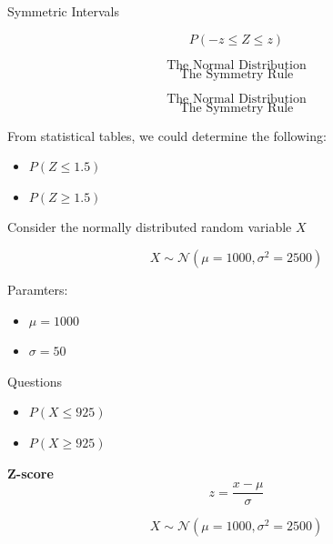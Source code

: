 \documentclass[12pt]{report}
\begin{document}
Symmetric Intervals

\[ P( -z \leq Z \leq z) \]










\huge
\[ \mbox{The Normal Distribution} \]
\Large
\[ \mbox{The Symmetry Rule} \]







\huge
\[ \mbox{The Normal Distribution} \]
\Large
\[ \mbox{The Symmetry Rule} \]



\Large
From statistical tables, we could determine the following:
\begin{itemize}
	\item $P(Z \leq 1.5) $
	\item $P(Z \geq 1.5) $
\end{itemize}



\Large

Consider the normally distributed random variable $X$

\[ X \sim \mathcal{N}(\mu=1000,\sigma^2 = 2500) \]

Paramters:
\begin{itemize}
	\item $\mu =1000$
	\item $\sigma =50$
\end{itemize}
Questions

\begin{itemize}
	\item $P(X \leq 925)$
	\item $P(X \geq 925)$
\end{itemize}




\textbf{Z-score}
\[ z =\frac{x - \mu}{\sigma}\]

\[ X \sim \mathcal{N}(\mu=1000,\sigma^2 = 2500) \]
\end{document}
